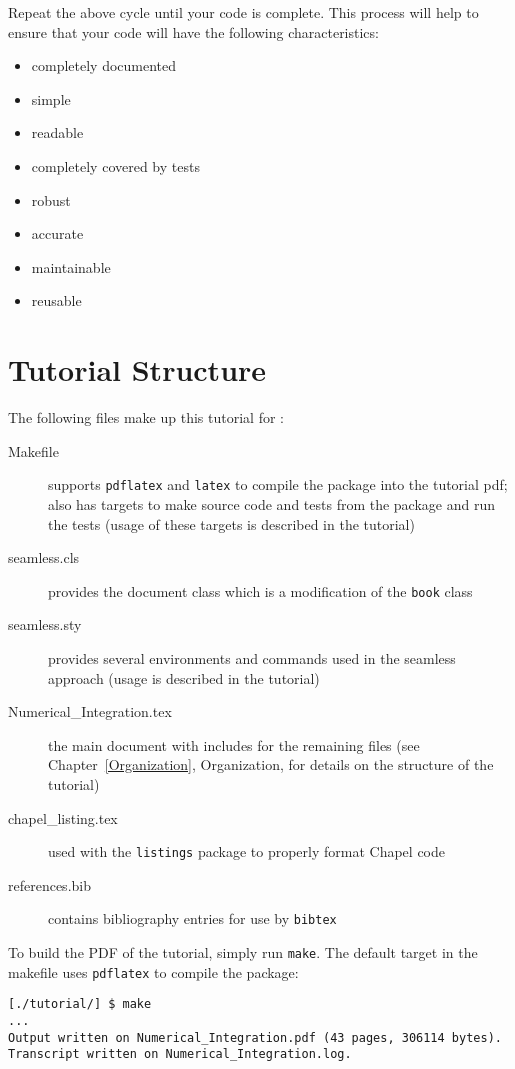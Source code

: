 Repeat the above cycle until your code is complete. This process will help to ensure that your code will 
have the following characteristics:
\begin{itemize}
  \item completely documented
  \item simple
  \item readable
  \item completely covered by tests
  \item robust
  \item accurate
  \item maintainable
  \item reusable
\end{itemize}

\section{Tutorial Structure}

The following files make up this tutorial for \seamless:
\begin{description}
  \item[Makefile] supports \verb|pdflatex| and \verb|latex| to compile the \latex package into the tutorial
    pdf; also has targets to make source code and tests from the \latex package and run the tests (usage of these
    targets is described in the tutorial)
  \item[seamless.cls] provides the \seamless \latex document class which is a modification of the \verb|book| class
  \item[seamless.sty] provides several environments and commands used in the seamless approach (usage is described
    in the tutorial)
  \item[Numerical\_Integration.tex] the main \latex document with includes for the remaining \latex files 
    (see Chapter~\ref{Organization}, Organization, for details on the structure of the tutorial)
  \item[chapel\_listing.tex] used with the \latex \verb|listings| package to properly format Chapel code
  \item[references.bib] contains bibliography entries for use by \verb|bibtex|
\end{description}

To build the PDF of the tutorial, simply run \verb|make|. The default target in the makefile uses \verb|pdflatex|
to compile the package:
\begin{verbatim}
[./tutorial/] $ make 
...
Output written on Numerical_Integration.pdf (43 pages, 306114 bytes).
Transcript written on Numerical_Integration.log.
\end{verbatim}

